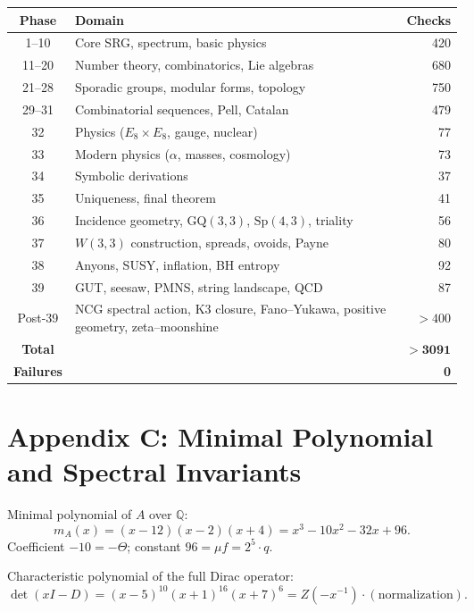 \documentclass[12pt,a4paper]{article}
\theoremstyle{definition}
\newcommand{\GQ}{\mathrm{GQ}}
\newcommand{\Sp}{\mathrm{Sp}}
\newcommand{\QQ}{\mathbb{Q}}
\begin{document}
\begin{center}
\small
\begin{tabular}{@{}cp{5.8cm}r@{}}
\toprule
\textbf{Phase} & \textbf{Domain} & \textbf{Checks} \\
\midrule
1--10  & Core SRG, spectrum, basic physics & 420 \\
11--20 & Number theory, combinatorics, Lie algebras & 680 \\
21--28 & Sporadic groups, modular forms, topology & 750 \\
29--31 & Combinatorial sequences, Pell, Catalan & 479 \\
32     & Physics ($E_8\!\times\! E_8$, gauge, nuclear) & 77 \\
33     & Modern physics ($\alpha$, masses, cosmology) & 73 \\
34     & Symbolic derivations & 37 \\
35     & Uniqueness, final theorem & 41 \\
36     & Incidence geometry, $\GQ(3,3)$, $\Sp(4,3)$, triality & 56 \\
37     & $W(3,3)$ construction, spreads, ovoids, Payne & 80 \\
38     & Anyons, SUSY, inflation, BH entropy & 92 \\
39     & GUT, seesaw, PMNS, string landscape, QCD & 87 \\
Post-39 & NCG spectral action, K3 closure, Fano--Yukawa,
          positive geometry, zeta--moonshine & $>400$ \\
\midrule
\textbf{Total} & & $\mathbf{>3091}$ \\
\textbf{Failures} & & \textbf{0} \\
\bottomrule
\end{tabular}
\end{center}


\section*{Appendix C: Minimal Polynomial and Spectral Invariants}
\label{app:minpoly}

Minimal polynomial of $A$ over $\QQ$:
\begin{equation}
  m_A(x) = (x-12)(x-2)(x+4) = x^3-10x^2-32x+96.
\end{equation}
Coefficient $-10=-\Theta$; constant $96=\mu f=2^5\cdot q$.

Characteristic polynomial of the full Dirac operator:
\begin{equation}
  \det(xI-D) = (x-5)^{10}(x+1)^{16}(x+7)^6 = Z(-x^{-1})\cdot(\text{normalization}).
\end{equation}
\end{document}
